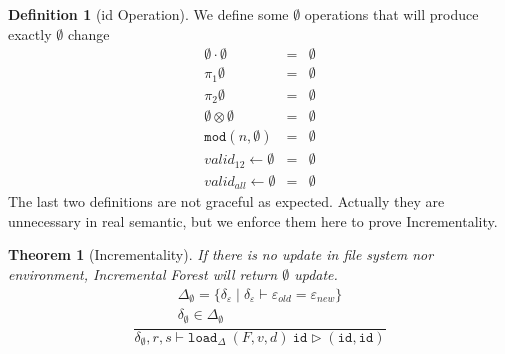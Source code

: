\documentclass[10pt,twoside,a4paper]{article}
\theoremstyle{theorem}
\newtheorem{theorem}{Theorem}[section]
\theoremstyle{lemma}
\theoremstyle{property}
\theoremstyle{definition}
\newtheorem{definition}{Definition}[section]
\theoremstyle{assumption}
\def\fst{\pi_1}
\def\snd{\pi_2}
\begin{document}
\newpage

\begin{definition}[id Operation]
We define some $\emptyset$ operations that will produce exactly $\emptyset$ change
\begin{eqnarray}
	\emptyset \cdot \emptyset &=& \emptyset\\
	\fst\emptyset &=& \emptyset\\
	\snd\emptyset &=& \emptyset\\
	\emptyset \otimes \emptyset &=& \emptyset\\
	\mathtt{mod}(n, \emptyset) &=& \emptyset\\
	valid_{12} \leftarrow \emptyset &=& \emptyset\\
	valid_{all} \leftarrow \emptyset &=& \emptyset
\end{eqnarray}
The last two definitions are not graceful as expected. Actually they are unnecessary in real semantic, but we enforce them here to prove Incrementality.
\end{definition}

\begin{theorem}[Incrementality]
If there is no update in file system nor environment, Incremental Forest will return $\emptyset$ update.
\begin{displaymath}
\frac{\begin{array}{c}
	\Delta_{\emptyset} = \{\delta_\varepsilon \mid \delta_\varepsilon \vdash \varepsilon_{old} = \varepsilon_{new}\} \\
	\delta_{\emptyset} \in \Delta_{\emptyset}
\end{array}}
	{\delta_{\emptyset}, r, s \vdash \mathtt{load}_\Delta~ (F,v,d)~ \mathtt{id} \rhd (\mathtt{id}, \mathtt{id})}
\end{displaymath}

\end{theorem}
\end{document}
